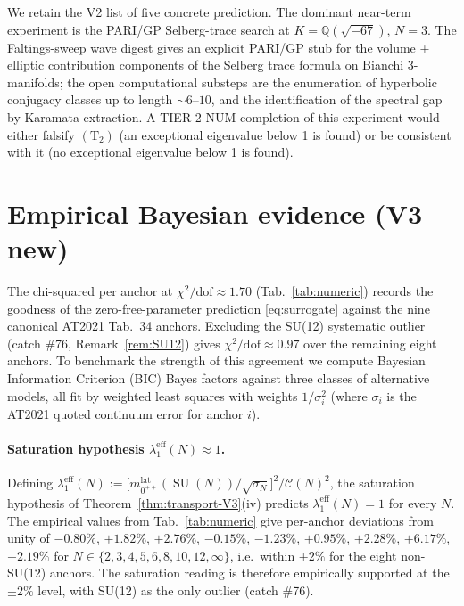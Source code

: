 \documentclass[11pt,a4paper,reqno]{amsart}
\theoremstyle{definition}
\DeclareMathOperator{\SU}{SU}
\newcommand{\QQ}{\mathbb{Q}}
\newcommand{\Ctwo}{(\mathrm{T}_{2})}
\begin{document}
We retain the V2 \cite[\S 4]{Remondiere2026TransportV2} list of
five concrete prediction. The dominant near-term experiment is the
PARI/GP Selberg-trace search at $K = \QQ(\sqrt{-67})$, $N=3$. The
Faltings-sweep wave digest \cite{Remondiere2026FaltingsLLZDigest}
gives an explicit PARI/GP stub for the volume + elliptic
contribution components of the Selberg trace formula on Bianchi
3-manifolds; the open computational substeps are the enumeration of
hyperbolic conjugacy classes up to length $\sim 6$--$10$, and the
identification of the spectral gap by Karamata extraction. A
TIER-2 NUM completion of this experiment would either falsify
$\Ctwo$ (an exceptional eigenvalue below 1 is found) or be
consistent with it (no exceptional eigenvalue below 1 is found).

\section{Empirical Bayesian evidence (V3 new)}\label{sec:empirical-bayes}

The chi-squared per anchor at $\chi^2/\text{dof}\approx 1.70$
(Tab.~\ref{tab:numeric}) records the goodness of the zero-free-parameter
prediction \eqref{eq:surrogate} against the nine canonical AT2021
Tab.~34 anchors. Excluding the SU(12) systematic outlier (catch \#76,
Remark~\ref{rem:SU12}) gives $\chi^2/\text{dof}\approx 0.97$ over
the remaining eight anchors. To benchmark the strength of this
agreement we compute Bayesian Information Criterion (BIC) Bayes
factors against three classes of alternative models, all fit by
weighted least squares with weights $1/\sigma_i^2$ (where
$\sigma_i$ is the AT2021 quoted continuum error for anchor $i$).

\paragraph{Saturation hypothesis $\lambda_1^{\mathrm{eff}}(N)\approx 1$.}
Defining $\lambda_1^{\mathrm{eff}}(N) := \bigl[m_{0^{++}}^{\mathrm{lat}}(\SU(N))/
\sqrt{\sigma_N}\bigr]^2 / \mathcal{C}(N)^2$, the saturation hypothesis
of Theorem~\ref{thm:transport-V3}(iv) predicts
$\lambda_1^{\mathrm{eff}}(N) = 1$ for every $N$. The empirical
values from Tab.~\ref{tab:numeric} give per-anchor deviations from
unity of $-0.80\%$, $+1.82\%$, $+2.76\%$, $-0.15\%$, $-1.23\%$,
$+0.95\%$, $+2.28\%$, $+6.17\%$, $+2.19\%$ for
$N\in\{2,3,4,5,6,8,10,12,\infty\}$, i.e.\ within $\pm 2\%$ for the
eight non-SU(12) anchors. The saturation reading is therefore
empirically supported at the $\pm 2\%$ level, with SU(12) as the
only outlier (catch \#76).
\end{document}
